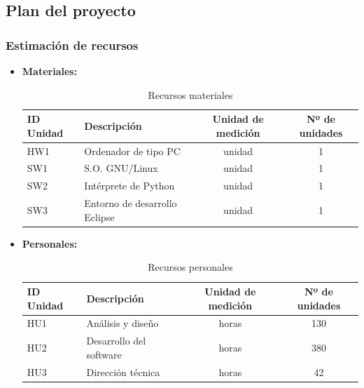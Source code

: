 
\subsection{Plan del proyecto}

\subsubsection{Estimación de recursos}

\begin{itemize}

  \item \textbf{ Materiales:}
	\begin{table}[H]
	 \begin{center}
	  \begin{tabular}{|l|l|c|c|}
		\hline
		\textbf{ID Unidad} & \textbf{Descripción} & \textbf{Unidad de medición} & \textbf{Nº de unidades} \\
		\hline
		HW1 & Ordenador de tipo PC & unidad & 1 \\
		\hline
		SW1 & S.O. GNU/Linux & unidad & 1 \\
		\hline
		SW2 & Intérprete de Python & unidad & 1 \\
		\hline
		SW3 & Entorno de desarrollo Eclipse & unidad & 1 \\
		\hline
	  \end{tabular}
	  \caption{Recursos materiales}
	 \end{center}
	\end{table}

  \item \textbf{Personales:}
	\begin{table}[H]
	 \begin{center}
	  \begin{tabular}{|l|l|c|c|}
		\hline
		\textbf{ID Unidad} & \textbf{Descripción} & \textbf{Unidad de medición} & \textbf{Nº de unidades} \\
		\hline
		HU1 & Análisis y diseño & horas & 130 \\
		\hline
		HU2 & Desarrollo del software & horas & 380 \\
		\hline
		HU3 & Dirección técnica & horas & 42 \\
		\hline
	  \end{tabular}
	  \caption{Recursos personales}
	 \end{center}
	\end{table}

\end{itemize}



